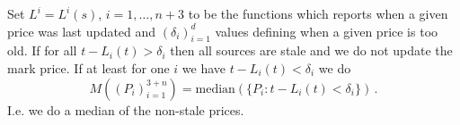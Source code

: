 \documentclass[10pt]{article}
\begin{document}
\begin{enumerate}
Set $L^{i}=L^{i}(s)$, $i=1,\ldots,n+3$ to be the functions which reports when a given price was last updated and $(\delta_i)_{i=1}^d$ values defining when a given price is too old. 
If for all $t-L_i(t) > \delta_i$ then all sources are stale and we do not update the mark price. 
If at least for one $i$ we have $t-L_i(t) < \delta_i$ we do 
\[
M((P_i)_{i=1}^{3+n}) = \text{median}(\{P_i : t-L_i(t) < \delta_i\}) \,.
\]
I.e. we do a median of the non-stale prices. 
%
%
%
\end{enumerate}
\end{document}
